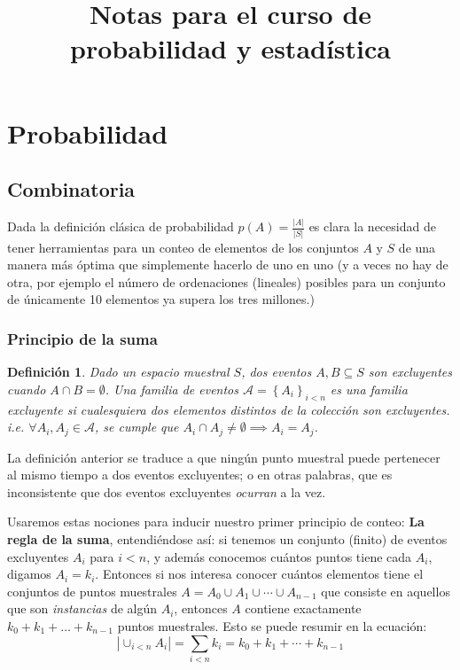 \documentclass[spanish]{report}
\title {Notas para el curso de probabilidad y estadística}
\newtheorem{defi}[thm]{Definición}
\newcommand{\card}[1]{\left|#1 \right|}
\begin{document}

\section*{Probabilidad}


\subsection*{Combinatoria}

Dada la definición clásica de probabilidad $p(A) = \frac{\card{A}}{\card{S}}$ es clara la necesidad de tener herramientas para un conteo de elementos de los conjuntos $A$ y $S$ de una manera más óptima que simplemente hacerlo de uno en uno (y a veces no hay de otra, por ejemplo el número de ordenaciones (lineales) posibles para un conjunto de únicamente 10 elementos ya supera los tres millones.)

\subsubsection{Principio de la suma}
\begin{defi}
	Dado un espacio muestral $S$, dos eventos $A, B \subseteq S$ son \emph{excluyentes} cuando $A \cap B = \emptyset$. 
	Una familia de eventos $\mathcal{A}= \left\lbrace A_i \right\rbrace_{i<n}$ es una \emph{familia excluyente} si cualesquiera dos elementos distintos de la colección son excluyentes. i.e. $\forall A_i, A_j \in \mathcal{A}$, se cumple que $A_i \cap A_j \neq \emptyset \implies A_i = A_j$.
\end{defi}

La definición anterior se traduce a que ningún punto muestral puede pertenecer al mismo tiempo a dos eventos excluyentes; o en otras palabras, que es inconsistente que dos eventos excluyentes \emph{ocurran} a la vez.

Usaremos estas nociones para inducir nuestro primer principio de conteo: \textbf{La regla de la suma}, entendiéndose así:
si tenemos un conjunto (finito) de eventos excluyentes $A_i$ para $i<n$, y además conocemos cuántos puntos tiene cada $A_i$, digamos $A_i = k_i$. Entonces si nos interesa conocer cuántos elementos tiene el conjuntos de puntos muestrales $A = A_0 \cup A_1 \cup \cdots \cup A_{n-1}$ que consiste en aquellos que son \emph{instancias} %
de algún $A_i$, entonces $A$ contiene exactamente $k_0 + k_1 + \ldots + k_{n-1}$ puntos muestrales.
Esto se puede resumir en la ecuación:
\begin{equation}\label{eq_PrincipioSuma}
	\card{\cup_{i<n} A_i} = \sum_{i<n} k_i = k_0 + k_1 + \cdots + k_{n-1}
\end{equation}
\end{document}
